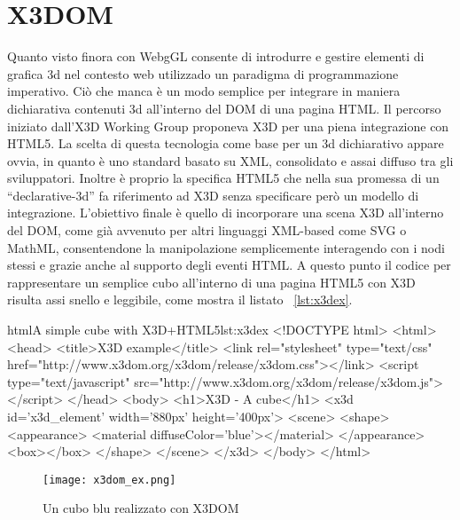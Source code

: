 \section{X3DOM}
Quanto visto finora con WebgGL consente di introdurre e gestire elementi di grafica 3d nel contesto web utilizzado un paradigma di programmazione imperativo. Ciò che manca è un modo semplice per integrare in maniera dichiarativa contenuti 3d all'interno del DOM di una pagina HTML. Il percorso iniziato dall'X3D Working Group proponeva X3D per una piena integrazione con HTML5. La scelta di questa tecnologia come base per un 3d dichiarativo appare ovvia, in quanto è uno standard basato su XML, consolidato e assai diffuso tra gli sviluppatori. Inoltre è proprio la specifica HTML5 che nella sua promessa di un ``declarative-3d'' fa riferimento ad X3D senza specificare però un modello di integrazione. L'obiettivo finale è quello di incorporare una scena X3D all'interno del DOM, come già avvenuto per altri linguaggi XML-based come SVG o MathML, consentendone la manipolazione semplicemente interagendo con i nodi stessi e grazie anche al supporto degli eventi HTML. A questo punto il codice per rappresentare un semplice cubo all'interno di una pagina HTML5 con X3D risulta assi snello e leggibile, come mostra il listato ~\ref{lst:x3dex}.

\begin{mylisting}{html}{A simple cube with X3D+HTML5}{lst:x3dex}
<!DOCTYPE html>
<html>
<head>
<title>X3D example</title>
<link rel="stylesheet" type="text/css" href="http://www.x3dom.org/x3dom/release/x3dom.css"></link>
<script type="text/javascript" src="http://www.x3dom.org/x3dom/release/x3dom.js"></script>
</head>
<body>
    <h1>X3D - A cube</h1>
    <x3d id='x3d_element' width='880px' height='400px'>
        <scene>
            <shape>
                <appearance>
                    <material diffuseColor='blue'></material>
                </appearance>
                <box></box>
            </shape>
        </scene>
    </x3d>
</body>
</html>
\end{mylisting}

\begin{figure}[Ht]
\centering
\texttt{[image: x3dom\_ex.png]}
\caption{Un cubo blu realizzato con X3DOM}
\label{label:x3domex}
\end{figure}

